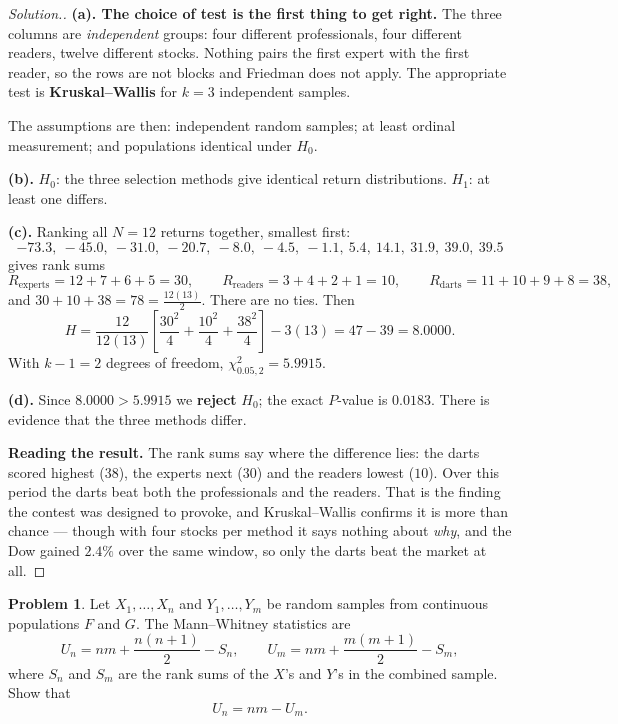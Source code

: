 \documentclass[11pt,a4paper]{article}
\theoremstyle{definition}
\newtheorem{problemx}{Problem}[section]
\newenvironment{problem}{\begin{problemx}}{\end{problemx}}
\newenvironment{solution}
  {\renewcommand{\qedsymbol}{}\begin{proof}[\textit{Solution}.]}
  {\end{proof}}
\begin{document}
\begin{solution}
\textbf{(a). The choice of test is the first thing to get right.} The three
columns are \emph{independent} groups: four different professionals, four different
readers, twelve different stocks. Nothing pairs the first expert with the first
reader, so the rows are not blocks and Friedman does not apply. The appropriate
test is \textbf{Kruskal--Wallis} for $k = 3$ independent samples.

The assumptions are then: independent random samples; at least ordinal
measurement; and populations identical under $H_0$.

\textbf{(b).} $H_0$: the three selection methods give identical return
distributions. $H_1$: at least one differs.

\textbf{(c).} Ranking all $N = 12$ returns together, smallest first:
$$-73.3,\ -45.0,\ -31.0,\ -20.7,\ -8.0,\ -4.5,\ -1.1,\ 5.4,\ 14.1,\ 31.9,\ 39.0,\ 39.5$$
gives rank sums
$$R_{\text{experts}} = 12+7+6+5 = 30,
\qquad
R_{\text{readers}} = 3+4+2+1 = 10,
\qquad
R_{\text{darts}} = 11+10+9+8 = 38,$$
and $30+10+38 = 78 = \frac{12(13)}{2}$. There are no ties. Then
$$H = \dfrac{12}{12(13)}\left[\dfrac{30^{2}}{4}+\dfrac{10^{2}}{4}+\dfrac{38^{2}}{4}\right]
- 3(13) = 47 - 39 = 8.0000 .$$
With $k-1 = 2$ degrees of freedom, $\chi^{2}_{0.05,2} = 5.9915$.

\textbf{(d).} Since $8.0000 > 5.9915$ we \textbf{reject} $H_0$; the exact
$P$-value is $0.0183$. There is evidence that the three methods differ.

\textbf{Reading the result.} The rank sums say where the difference lies: the darts
scored highest ($38$), the experts next ($30$) and the readers lowest ($10$). Over
this period the darts beat both the professionals and the readers. That is the
finding the contest was designed to provoke, and Kruskal--Wallis confirms it is
more than chance --- though with four stocks per method it says nothing about
\emph{why}, and the Dow gained $2.4\%$ over the same window, so only the darts beat
the market at all.
\end{solution}

\begin{problem}
Let $X_1,\ldots,X_n$ and $Y_1,\ldots,Y_m$ be random samples from continuous
populations $F$ and $G$. The Mann--Whitney statistics are
$$U_n = nm + \dfrac{n(n+1)}{2} - S_n,
\qquad
U_m = nm + \dfrac{m(m+1)}{2} - S_m ,$$
where $S_n$ and $S_m$ are the rank sums of the $X$'s and $Y$'s in the combined
sample. Show that
$$U_n = nm - U_m .$$
\end{problem}
\end{document}
